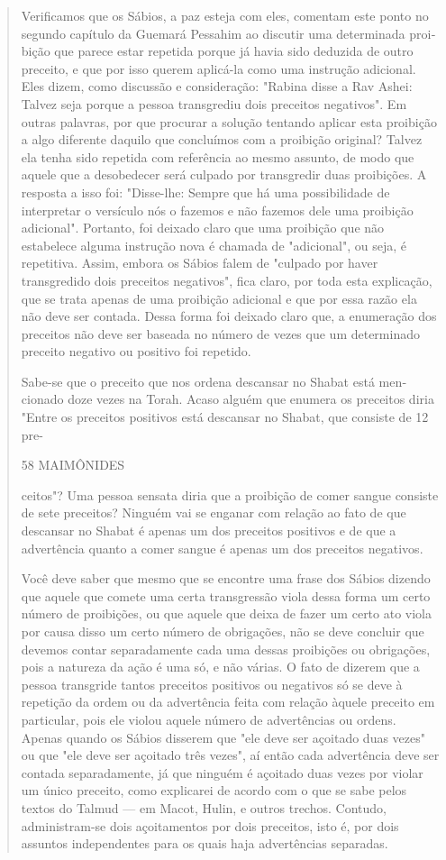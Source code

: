 \begin{quote}
Verificamos que os Sábios, a paz esteja com eles, comentam este pon­to
no segundo capítulo da Guemará Pessahim ao discutir uma determinada
proi­bição que parece estar repetida porque já havia sido deduzida de
outro precei­to, e que por isso querem aplicá-la como uma instrução
adicional. Eles dizem, como discussão e consideração: "Rabina disse a
Rav Ashei: Talvez seja porque a pessoa transgrediu dois preceitos
negativos". Em outras palavras, por que pro­curar a solução tentando
aplicar esta proibição a algo diferente daquilo que con­cluímos com a
proibição original? Talvez ela tenha sido repetida com referên­cia ao
mesmo assunto, de modo que aquele que a desobedecer será culpado por
transgredir duas proibições. A resposta a isso foi: "Disse-lhe: Sempre
que há uma possibilidade de interpretar o versículo nós o fazemos e não
fazemos dele uma proibição adicional". Portanto, foi deixado claro que
uma proibição que não estabelece alguma instrução nova é chamada de
"adicional", ou seja, é repetitiva. Assim, embora os Sábios falem de
"culpado por haver transgredi­do dois preceitos negativos", fica claro,
por toda esta explicação, que se trata apenas de uma proibição adicional
e que por essa razão ela não deve ser conta­da. Dessa forma foi deixado
claro que, a enumeração dos preceitos não deve ser baseada no número de
vezes que um determinado preceito negativo ou po­sitivo foi repetido.

Sabe-se que o preceito que nos ordena descansar no Shabat está
men­cionado doze vezes na Torah. Acaso alguém que enumera os preceitos
diria "Entre os preceitos positivos está descansar no Shabat, que
consiste de 12 pre-

58 MAIMÔNIDES

ceitos"? Uma pessoa sensata diria que a proibição de comer sangue
consiste de sete preceitos? Ninguém vai se enganar com relação ao fato
de que descan­sar no Shabat é apenas um dos preceitos positivos e de que
a advertência quan­to a comer sangue é apenas um dos preceitos
negativos.

Você deve saber que mesmo que se encontre uma frase dos Sábios dizendo
que aquele que comete uma certa transgressão viola dessa forma um certo
número de proibições, ou que aquele que deixa de fazer um certo ato
viola por causa disso um certo número de obrigações, não se deve
concluir que devemos contar separadamente cada uma dessas proibições ou
obrigações, pois a natureza da ação é uma só, e não várias. O fato de
dizerem que a pessoa transgride tantos preceitos positivos ou negativos
só se deve à repetição da or­dem ou da advertência feita com relação
àquele preceito em particular, pois ele violou aquele número de
advertências ou ordens. Apenas quando os Sábios disserem que "ele deve
ser açoitado duas vezes" ou que "ele deve ser açoitado três vezes", aí
então cada advertência deve ser contada separadamente, já que ninguém é
açoitado duas vezes por violar um único preceito, como explicarei de
acordo com o que se sabe pelos textos do Talmud --- em Macot, Hulin, e
outros trechos. Contudo, administram-se dois açoitamentos por dois
preceitos, isto é, por dois assuntos independentes para os quais haja
advertências separadas.


\end{quote}
